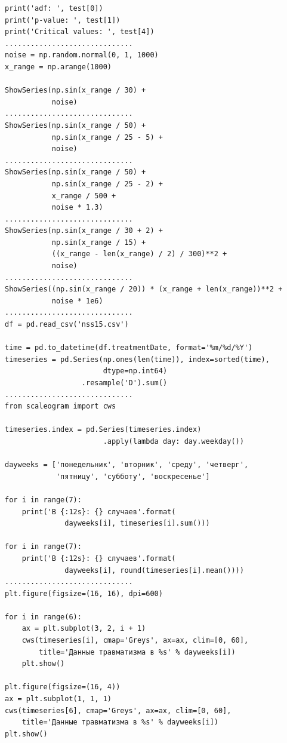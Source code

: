 \documentclass[a4paper]{article}
\begin{document}
\begin{lstlisting}[inputencoding={utf8}]
print('adf: ', test[0])
print('p-value: ', test[1])
print('Critical values: ', test[4])
..............................
noise = np.random.normal(0, 1, 1000)
x_range = np.arange(1000)

ShowSeries(np.sin(x_range / 30) +
           noise)
..............................
ShowSeries(np.sin(x_range / 50) + 
           np.sin(x_range / 25 - 5) +
           noise)
..............................
ShowSeries(np.sin(x_range / 50) + 
           np.sin(x_range / 25 - 2) +
           x_range / 500 + 
           noise * 1.3)
..............................
ShowSeries(np.sin(x_range / 30 + 2) + 
           np.sin(x_range / 15) + 
           ((x_range - len(x_range) / 2) / 300)**2 +
           noise)
..............................
ShowSeries((np.sin(x_range / 20)) * (x_range + len(x_range))**2 +
           noise * 1e6)
..............................
df = pd.read_csv('nss15.csv')

time = pd.to_datetime(df.treatmentDate, format='%m/%d/%Y')
timeseries = pd.Series(np.ones(len(time)), index=sorted(time),
                       dtype=np.int64)
                  .resample('D').sum()
..............................
from scaleogram import cws

timeseries.index = pd.Series(timeseries.index)
                       .apply(lambda day: day.weekday())

dayweeks = ['понедельник', 'вторник', 'среду', 'четверг',
            'пятницу', 'субботу', 'воскресенье']

for i in range(7):
    print('В {:12s}: {} случаев'.format(
              dayweeks[i], timeseries[i].sum()))

for i in range(7):
    print('В {:12s}: {} случаев'.format(
              dayweeks[i], round(timeseries[i].mean())))
..............................
plt.figure(figsize=(16, 16), dpi=600)

for i in range(6):
    ax = plt.subplot(3, 2, i + 1)
    cws(timeseries[i], cmap='Greys', ax=ax, clim=[0, 60],
        title='Данные травматизма в %s' % dayweeks[i])
    plt.show()

plt.figure(figsize=(16, 4))
ax = plt.subplot(1, 1, 1)
cws(timeseries[6], cmap='Greys', ax=ax, clim=[0, 60], 
    title='Данные травматизма в %s' % dayweeks[i])
plt.show()

	\end{lstlisting}
	
	\newpage
	
	
\end{document}

